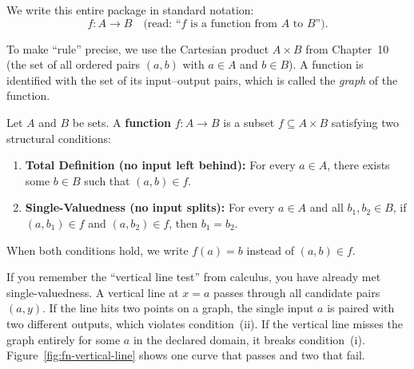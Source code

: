 We write this entire package in standard notation:
\[
f: A \to B \quad \text{(read: ``$f$ is a function from $A$ to $B$'')}.
\]

To make ``rule'' precise, we use the Cartesian product $A \times B$ from Chapter~10 (the set of all ordered pairs $(a, b)$ with $a \in A$ and $b \in B$). A function is identified with the set of its input--output pairs, which is called the \emph{graph} of the function.

\begin{definition}[Function]
Let $A$ and $B$ be sets. A \textbf{function} $f: A \to B$ is a subset $f \subseteq A \times B$ satisfying two structural conditions:
\begin{enumerate}[label=(\roman*)]
\item \textbf{Total Definition (no input left behind):} For every $a \in A$, there exists some $b \in B$ such that $(a, b) \in f$.
\item \textbf{Single-Valuedness (no input splits):} For every $a \in A$ and all $b_1, b_2 \in B$, if $(a, b_1) \in f$ and $(a, b_2) \in f$, then $b_1 = b_2$.
\end{enumerate}
When both conditions hold, we write $f(a) = b$ instead of $(a, b) \in f$.
\end{definition}

If you remember the ``vertical line test'' from calculus, you have already met single-valuedness. A vertical line at $x = a$ passes through all candidate pairs $(a, y)$. If the line hits two points on a graph, the single input $a$ is paired with two different outputs, which violates condition~(ii). If the vertical line misses the graph entirely for some $a$ in the declared domain, it breaks condition~(i). Figure~\ref{fig:fn-vertical-line} shows one curve that passes and two that fail.

